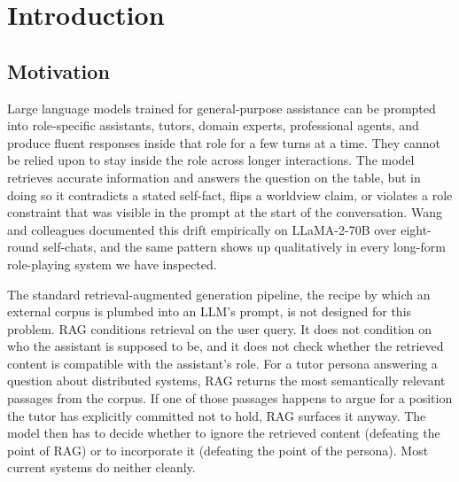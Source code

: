 \chapter{Introduction}
\label{ch:introduction}

\section{Motivation}

Large language models trained for general-purpose assistance can be prompted into role-specific assistants, tutors, domain experts, professional agents, and produce fluent responses inside that role for a few turns at a time. They cannot be relied upon to stay inside the role across longer interactions. The model retrieves accurate information and answers the question on the table, but in doing so it contradicts a stated self-fact, flips a worldview claim, or violates a role constraint that was visible in the prompt at the start of the conversation. Wang and colleagues documented this drift empirically on LLaMA-2-70B over eight-round self-chats\autocite{wang2024drift}, and the same pattern shows up qualitatively in every long-form role-playing system we have inspected.

The standard retrieval-augmented generation pipeline, the recipe by which an external corpus is plumbed into an LLM's prompt, is not designed for this problem\autocite{lewis2020rag}. RAG conditions retrieval on the user query. It does not condition on who the assistant is supposed to be, and it does not check whether the retrieved content is compatible with the assistant's role. For a tutor persona answering a question about distributed systems, RAG returns the most semantically relevant passages from the corpus. If one of those passages happens to argue for a position the tutor has explicitly committed not to hold, RAG surfaces it anyway. The model then has to decide whether to ignore the retrieved content (defeating the point of RAG) or to incorporate it (defeating the point of the persona). Most current systems do neither cleanly.

